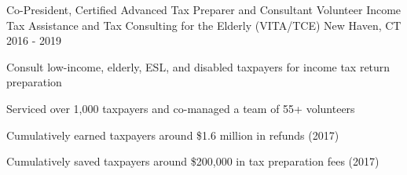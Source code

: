 

\begin{cventries}

    
  \cventry
    {Co-President, Certified Advanced Tax Preparer and Consultant} %
    {Volunteer Income Tax Assistance and Tax Consulting for the Elderly (VITA/TCE)} %
    {New Haven, CT} %
    {2016 - 2019} %
    {
        Consult low-income, elderly, ESL, and disabled taxpayers for income tax return preparation \hfill \break
        \begin{cvitems}
            \item {Serviced over 1,000 taxpayers and co-managed a team of 55+ volunteers}
            \item {Cumulatively earned taxpayers around \$1.6 million in refunds (2017)}
            \item {Cumulatively saved taxpayers around \$200,000 in tax preparation fees (2017)}
        \end{cvitems}
    }

\end{cventries}
